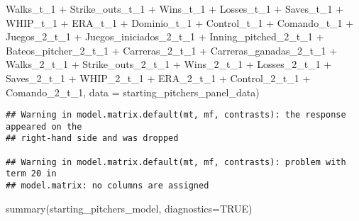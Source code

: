 \documentclass[
]{article}
\newenvironment{Shaded}{\begin{snugshade}}{\end{snugshade}}
\newcommand{\AttributeTok}[1]{\textcolor[rgb]{0.77,0.63,0.00}{#1}}
\newcommand{\ConstantTok}[1]{\textcolor[rgb]{0.00,0.00,0.00}{#1}}
\newcommand{\FunctionTok}[1]{\textcolor[rgb]{0.00,0.00,0.00}{#1}}
\newcommand{\NormalTok}[1]{#1}
\newcommand{\SpecialCharTok}[1]{\textcolor[rgb]{0.00,0.00,0.00}{#1}}
\begin{document}
\begin{Shaded}
\begin{Highlighting}[]
\NormalTok{Walks\_t\_1  }\SpecialCharTok{+}\NormalTok{ Strike\_outs\_t\_1 }\SpecialCharTok{+}\NormalTok{ Wins\_t\_1 }\SpecialCharTok{+}\NormalTok{  Losses\_t\_1 }\SpecialCharTok{+}\NormalTok{ Saves\_t\_1 }\SpecialCharTok{+}\NormalTok{ WHIP\_t\_1 }\SpecialCharTok{+}\NormalTok{ ERA\_t\_1 }\SpecialCharTok{+}\NormalTok{  Dominio\_t\_1 }\SpecialCharTok{+}\NormalTok{ Control\_t\_1 }\SpecialCharTok{+}         
\NormalTok{Comando\_t\_1 }\SpecialCharTok{+}\NormalTok{ Juegos\_2\_t\_1 }\SpecialCharTok{+}\NormalTok{ Juegos\_iniciados\_2\_t\_1 }\SpecialCharTok{+}\NormalTok{ Inning\_pitched\_2\_t\_1 }\SpecialCharTok{+}\NormalTok{ Bateos\_pitcher\_2\_t\_1 }\SpecialCharTok{+}\NormalTok{ Carreras\_2\_t\_1  }\SpecialCharTok{+} 
\NormalTok{Carreras\_ganadas\_2\_t\_1 }\SpecialCharTok{+}\NormalTok{ Walks\_2\_t\_1 }\SpecialCharTok{+}\NormalTok{ Strike\_outs\_2\_t\_1 }\SpecialCharTok{+}\NormalTok{ Wins\_2\_t\_1 }\SpecialCharTok{+}\NormalTok{ Losses\_2\_t\_1 }\SpecialCharTok{+}\NormalTok{ Saves\_2\_t\_1 }\SpecialCharTok{+}\NormalTok{ WHIP\_2\_t\_1 }\SpecialCharTok{+}
\NormalTok{ERA\_2\_t\_1 }\SpecialCharTok{+}\NormalTok{ Control\_2\_t\_1 }\SpecialCharTok{+}\NormalTok{ Comando\_2\_t\_1,}
\AttributeTok{data =}\NormalTok{ starting\_pitchers\_panel\_data)  }
\end{Highlighting}
\end{Shaded}

\begin{verbatim}
## Warning in model.matrix.default(mt, mf, contrasts): the response appeared on the
## right-hand side and was dropped

## Warning in model.matrix.default(mt, mf, contrasts): problem with term 20 in
## model.matrix: no columns are assigned
\end{verbatim}

\begin{Shaded}
\begin{Highlighting}[]
\FunctionTok{summary}\NormalTok{(starting\_pitchers\_model, }\AttributeTok{diagnostics=}\ConstantTok{TRUE}\NormalTok{)}
\end{Highlighting}
\end{Shaded}
\end{document}
